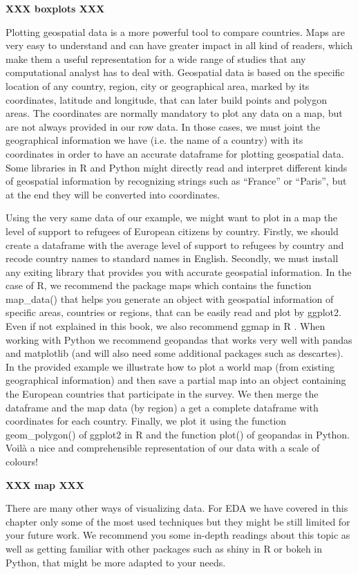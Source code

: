 \textbf{XXX  boxplots  XXX}

Plotting geospatial data is a more powerful tool to compare countries.  Maps are very easy to understand and can have greater impact in all kind of readers, which make them a useful representation for a wide range of studies that any computational analyst has to deal with. Geospatial data is based on the specific location of any country, region, city or geographical area, marked by its coordinates, latitude and longitude, that can later build points and polygon areas. The coordinates are normally mandatory to plot any data on a map, but are not always provided in our row data. In those cases, we must joint the geographical information we have (i.e. the name of a country) with its coordinates in order to have an accurate dataframe for plotting geospatial data. Some libraries in R and Python might directly read and interpret different kinds of geospatial information by recognizing strings such as “France” or “Paris”, but at the end they will be converted into coordinates. 

Using the very same data of our example, we might want to plot in a map the level of support to refugees of European citizens by country. Firstly, we should create a dataframe with the average level of support to refugees by country and recode country names to standard names in English. Secondly, we must install any exiting library that provides you with accurate geospatial information. In the case of R, we recommend the package maps which contains the function map\_data() that helps you generate an object with geospatial information of specific areas, countries or regions, that can be easily read and plot by ggplot2. Even if not explained in this book, we also recommend ggmap in R \cite{kahle2013ggmap}. When working with Python we recommend geopandas that works very well with pandas and matplotlib (and will also need some additional packages such as descartes).  In the provided example we illustrate how to plot a world map (from existing geographical information) and then save a partial map into an object containing the European countries that participate in the survey. We then merge the dataframe and the map data (by region) a get a complete dataframe with coordinates for each country.  Finally, we plot it using the function geom\_polygon() of ggplot2 in R and the function plot() of geopandas in Python. Voilà a nice and comprehensible representation of our data with a scale of colours!

\textbf{XXX  map  XXX}

There are many other ways of visualizing data. For EDA we have covered in this chapter only some of the most used techniques but they might be still limited for your future work. We recommend you some in-depth readings about this topic\cite{tufte2006beautiful}\cite{cairo2019charts} as well as getting familiar with other packages such as shiny in R or bokeh in Python, that might be more adapted to your needs.

